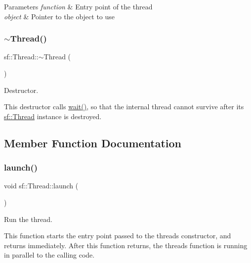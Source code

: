 \begin{DoxyParams}{Parameters}
{\em function} & Entry point of the thread \\
\hline
{\em object} & Pointer to the object to use \\
\hline
\end{DoxyParams}
\mbox{\label{classsf_1_1_thread_af77942fc1730af7c31bc4c3a913a9c1d}} 
\subsubsection{\texorpdfstring{$\sim$\+Thread()}{~Thread()}}
{\footnotesize\ttfamily sf\+::\+Thread\+::$\sim$\+Thread (\begin{DoxyParamCaption}{ }\end{DoxyParamCaption})}



Destructor. 

This destructor calls \hyperlink{classsf_1_1_thread_a724b1f94c2d54f84280f2f78bde95fa0}{wait()}, so that the internal thread cannot survive after its \hyperlink{classsf_1_1_thread}{sf\+::\+Thread} instance is destroyed. 

\subsection{Member Function Documentation}
\mbox{\label{classsf_1_1_thread_a74f75a9e86e1eb47479496314048b5f6}} 
\subsubsection{\texorpdfstring{launch()}{launch()}}
{\footnotesize\ttfamily void sf\+::\+Thread\+::launch (\begin{DoxyParamCaption}{ }\end{DoxyParamCaption})}



Run the thread. 

This function starts the entry point passed to the thread\textquotesingle{}s constructor, and returns immediately. After this function returns, the thread\textquotesingle{}s function is running in parallel to the calling code. \mbox{\label{classsf_1_1_thread_ad6b205d4f1ce38b8d44bba0f5501477c}} 
